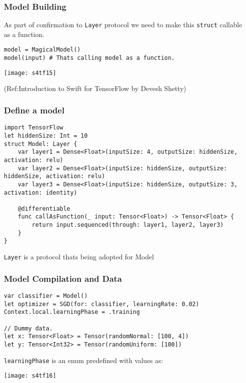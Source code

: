 \begin{frame}[fragile] \frametitle{Model Building}

As part of confirmation to \lstinline|Layer| protocol we need to make this \lstinline|struct| callable as a function.

\begin{lstlisting}
model = MagicalModel()
model(input) # Thats calling model as a function.
\end{lstlisting}


\begin{center}
\texttt{[image: s4tf15]}
\end{center}


{\tiny (Ref:Introduction to Swift for TensorFlow by Devesh Shetty)}

\end{frame}



\begin{frame}[fragile] \frametitle{Define a model}

\begin{lstlisting}[basicstyle=\scriptsize]
import TensorFlow
let hiddenSize: Int = 10
struct Model: Layer {
    var layer1 = Dense<Float>(inputSize: 4, outputSize: hiddenSize, activation: relu)
    var layer2 = Dense<Float>(inputSize: hiddenSize, outputSize: hiddenSize, activation: relu)
    var layer3 = Dense<Float>(inputSize: hiddenSize, outputSize: 3, activation: identity)
    
    @differentiable
    func callAsFunction(_ input: Tensor<Float>) -> Tensor<Float> {
        return input.sequenced(through: layer1, layer2, layer3)
    }
}
\end{lstlisting}

\lstinline|Layer| is a protocol thats being adopted for Model


\end{frame}

\begin{frame}[fragile] \frametitle{Model Compilation and Data}


\begin{lstlisting}[basicstyle=\scriptsize]
var classifier = Model()
let optimizer = SGD(for: classifier, learningRate: 0.02)
Context.local.learningPhase = .training

// Dummy data.
let x: Tensor<Float> = Tensor(randomNormal: [100, 4])
let y: Tensor<Int32> = Tensor(randomUniform: [100])
\end{lstlisting}

\lstinline|learningPhase| is an enum predefined with values as:


\begin{center}
\texttt{[image: s4tf16]}
\end{center}



\end{frame}

